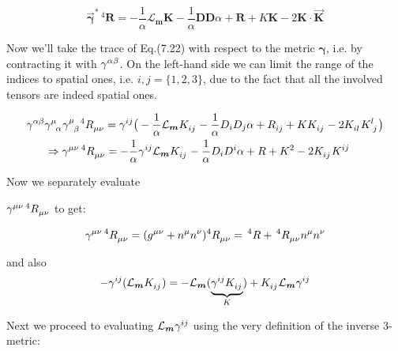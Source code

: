 \documentclass[12pt]{article}
\renewcommand{\vec}[1]{\bm{#1}}
\numberwithin{equation}{section}
\numberwithin{theorem}{subsection}
\begin{document}
\begin{equation*}

    \overrightarrow{\vec{\gamma}}^{*} \, ^{4} \vec{R} = -\frac{1}{\alpha}\mathcal{L}_{\vec{m}}\vec{K} - \frac{1}{\alpha} \vec{D}\vec{D}\alpha +\vec{R} + K\vec{K} - 2\vec{K} \cdot \overrightarrow{\vec{K}}

\end{equation*}

Now we'll take the trace of Eq.(7.22) with respect to the metric $\vec{\gamma}$, i.e. by contracting it with $\tensor{\gamma}{^\alpha^\beta}$. On the left-hand side we can limit the range of the indices to spatial ones, i.e. $i,j =\{1,2,3\}$, due to the fact that all the involved tensors are indeed spatial ones. 

\begin{align}

    &\tensor{\gamma}{^\alpha^\beta}\tensor{\gamma}{^\mu_\alpha}\tensor{\gamma}{^\mu_\beta}^{4}\tensor{R}{_\mu_\nu} = \tensor{\gamma}{^i^j}\big(-\frac{1}{\alpha}\mathcal{L}_{\vec{m}}\tensor{K}{_i_j} - \frac{1}{\alpha}D_{i}D_{j}\alpha + \tensor{R}{_i_j}+ K\tensor{K}{_i_j}-2\tensor{K}{_i_l}\tensor{K}{^l_j}\big)\notag \\

    & \;\;\;\;\;\; \Rightarrow  \tensor{\gamma}{^\mu^\nu}\,^{4}\tensor{R}{_\mu_\nu} = -\frac{1}{\alpha}\tensor{\gamma}{^i^j}\mathcal{L}_{\vec{m}}\tensor{K}{_i_j} - \frac{1}{\alpha} D_{i}D^{i}\alpha + R + K^{2} -2\tensor{K}{_i_j}\tensor{K}{^i^j}

\end{align}

Now we separately evaluate 

$\tensor{\gamma}{^\mu^\nu}\,^{4}\tensor{R}{_\mu_\nu}$ to get: 

$$\tensor{\gamma}{^\mu^\nu}\,^{4}\tensor{R}{_\mu_\nu} = (\tensor{g}{^\mu^\nu}+n^{\mu}n^{\nu})^{4}\tensor{R}{_\mu_\nu} =\,^{4}R +\,^{4}\tensor{R}{_\mu_\nu}n^{\mu}n^{\nu}$$

and also $$-\tensor{\gamma}{^i^j}(\mathcal{L}_{\vec{m}}\tensor{K}{_i_j}) = -\mathcal{L}_{\vec{m}}(\underbrace{\tensor{\gamma}{^i^j}\tensor{K}{_i_j}}_{K})+\tensor{K}{_i_j}\mathcal{L}_{\vec{m}}\tensor{\gamma}{^i^j}$$

Next we proceed to evaluating $\mathcal{L}_{\vec{m}}\tensor{\gamma}{^i^j}$ using the very definition of the inverse 3-metric:
\end{document}
